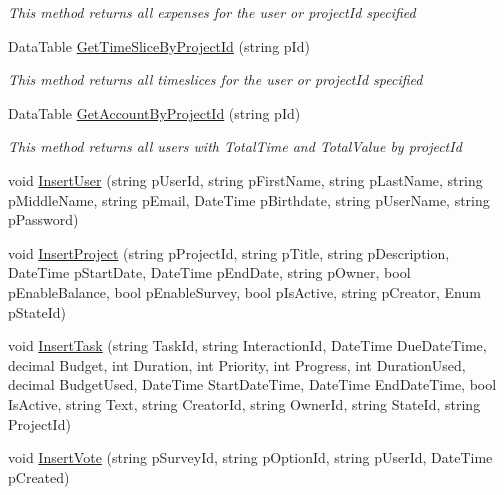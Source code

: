 \begin{DoxyCompactItemize}
\begin{DoxyCompactList}\small\item\em This method returns all expenses for the user or project\+Id specified \end{DoxyCompactList}\item 
Data\+Table \hyperlink{class_plex_byte_1_1_mo_cap_1_1_backend_1_1_backend_service_aecab0686e55208dd16015580bc4082fc}{Get\+Time\+Slice\+By\+Project\+Id} (string p\+Id)
\begin{DoxyCompactList}\small\item\em This method returns all timeslices for the user or project\+Id specified \end{DoxyCompactList}\item 
Data\+Table \hyperlink{class_plex_byte_1_1_mo_cap_1_1_backend_1_1_backend_service_a84dac75b5ae2e9d807f9f617c652cfa0}{Get\+Account\+By\+Project\+Id} (string p\+Id)
\begin{DoxyCompactList}\small\item\em This method returns all users with Total\+Time and Total\+Value by project\+Id \end{DoxyCompactList}\item 
void \hyperlink{class_plex_byte_1_1_mo_cap_1_1_backend_1_1_backend_service_a3116d762269dad9511ad9be65b8bbc7a}{Insert\+User} (string p\+User\+Id, string p\+First\+Name, string p\+Last\+Name, string p\+Middle\+Name, string p\+Email, Date\+Time p\+Birthdate, string p\+User\+Name, string p\+Password)
\item 
void \hyperlink{class_plex_byte_1_1_mo_cap_1_1_backend_1_1_backend_service_af96d38adf2f202848701f9ca94148265}{Insert\+Project} (string p\+Project\+Id, string p\+Title, string p\+Description, Date\+Time p\+Start\+Date, Date\+Time p\+End\+Date, string p\+Owner, bool p\+Enable\+Balance, bool p\+Enable\+Survey, bool p\+Is\+Active, string p\+Creator, Enum p\+State\+Id)
\item 
void \hyperlink{class_plex_byte_1_1_mo_cap_1_1_backend_1_1_backend_service_afe6896f1ee35541cf824d5e44e58b013}{Insert\+Task} (string Task\+Id, string Interaction\+Id, Date\+Time Due\+Date\+Time, decimal Budget, int Duration, int Priority, int Progress, int Duration\+Used, decimal Budget\+Used, Date\+Time Start\+Date\+Time, Date\+Time End\+Date\+Time, bool Is\+Active, string Text, string Creator\+Id, string Owner\+Id, string State\+Id, string Project\+Id)
\item 
void \hyperlink{class_plex_byte_1_1_mo_cap_1_1_backend_1_1_backend_service_a0d1bc95f01b316823e1a45471f91ba85}{Insert\+Vote} (string p\+Survey\+Id, string p\+Option\+Id, string p\+User\+Id, Date\+Time p\+Created)

\end{DoxyCompactItemize}
